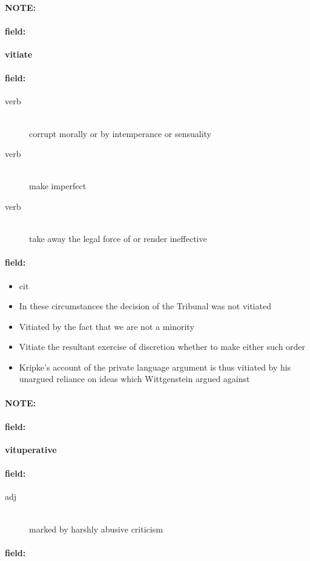 \documentclass[12pt]{article}
\newenvironment{note}{\paragraph{NOTE:}}{}
\newenvironment{field}{\paragraph{field:}}{}
\begin{document}
\begin{note}
\begin{field}
\textbf{\large vitiate}
\end{field}


\begin{field}
\begin{description}
\item[verb] \hfill \\ 
corrupt morally or by intemperance or sensuality

\item[verb] \hfill \\ 
make imperfect

\item[verb] \hfill \\ 
take away the legal force of or render ineffective

\end{description}
\end{field}

\begin{field}
\begin{itemize}
\item  cit
\item In these circumstances the decision of the Tribunal was not vitiated
\item Vitiated by the fact that we are not a minority
\item Vitiate the resultant exercise of discretion whether to make either such order
\item Kripke's account of the private language argument is thus vitiated by his unargued reliance on ideas which Wittgenstein argued against
\end{itemize}
\end{field}
\end{note}
\begin{note}
\begin{field}
\textbf{\large vituperative}
\end{field}


\begin{field}
\begin{description}
\item[adj] \hfill \\ 
marked by harshly abusive criticism

\end{description}
\end{field}

\begin{field}
\end{field}
\end{note}
\end{document}
